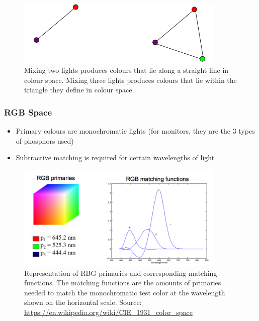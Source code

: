 \documentclass[letterpaper,12pt]{article}
\begin{document}
\begin{figure}[h!]
 \centering
 \includegraphics[width=10cm]{images/colour.png}
 \caption{Mixing two lights produces colours that lie along a straight line in colour space. Mixing three lights produces colours that lie within the triangle they define in colour space.}
\end{figure}

\subsubsection{RGB Space}
\begin{itemize}
 \item Primary colours are monochromatic lights (for monitors, they are the 3 types of phosphors used)
 \item Subtractive matching is required for certain wavelengths of light
\end{itemize}

\begin{figure}[h!]
 \centering
 \includegraphics[width=10cm]{images/rgb.png}
 \caption{Representation of RBG primaries and corresponding matching functions. The matching functions are the amounts of primaries needed to match the monochromatic test color at the wavelength shown on the horizontal scale. Source: \url{https://en.wikipedia.org/wiki/CIE_1931_color_space}}
\end{figure}
\end{document}

